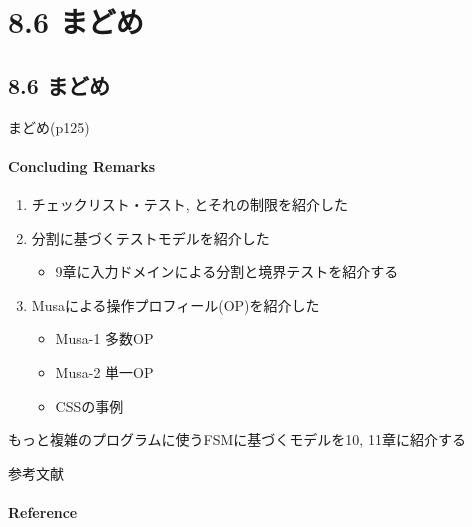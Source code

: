 \section{8.6 まどめ}
\subsection{8.6 まどめ}
\begin{frame}{まどめ(p125)}
\framesubtitle{Concluding Remarks}
\begin{enumerate}
\item チェックリスト・テスト, とそれの制限を紹介した
\item 分割に基づくテストモデルを紹介した
    \begin{itemize}
    \item 9章に入力ドメインによる分割と境界テストを紹介する
    \end{itemize}
\item Musaによる操作プロフィール(OP)を紹介した
    \begin{itemize}
    \item Musa-1 多数OP
    \item Musa-2 単一OP
    \item CSSの事例
    \end{itemize}
\end{enumerate}
もっと複雑のプログラムに使うFSMに基づくモデルを10, 11章に紹介する
\end{frame}

\appendix
\backupbegin
\begin{frame}{参考文献}
\framesubtitle{Reference}


\end{frame}
\backupend

